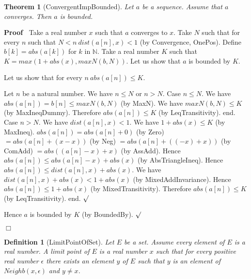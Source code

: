 \documentclass{article}
\newenvironment{forthel}{\begin{leftbar}}{\end{leftbar}}
\newenvironment{proof}{\noindent\textbf{Proof\ }}{\hspace*{\fill}$\Box$\medskip}
\newenvironment{subproof}{\begin{list}{}{}
		\item[\text{Proof}]}{\hfill $\surd$ \end{list}}
\newtheorem{theorem}{Theorem}
\newtheorem{definition}{Definition}
\newcommand{\NN}{\mathbb{N}}
\newcommand{\dotequal}{=}
\begin{document}
\begin{forthel}
	\begin{theorem}[ConvergentImpBounded]
	Let $a$ be a sequence. Assume that $a$ converges. Then $a$ is bounded.
	\end{theorem}
	\begin{proof}
	Take a real number $x$ such that $a$ converges to $x$.
	Take $N$ such that for every $n$ such that $N < n \ dist(a[n],x) < 1$ (by Convergence, OnePos).
	Define $b[k] = abs(a[k])$ for $k$ in $\NN$.
	Take a real number $K$ such that $K = max(1 + abs(x), maxN(b,N))$.
	Let us show that $a$ is bounded by $K$.
	\begin{subproof}
	Let us show that for every $n \ abs(a[n]) \leq K$.
	\begin{subproof} 
	Let $n$ be a natural number.
	We have $n \leq N$ or $n > N$.
	Case $n \leq N$.
	We have $abs(a[n]) = b[n] \leq maxN(b,N)$ (by MaxN).
	We have $maxN(b,N) \leq K$ (by MaxIneqDummy).
	Therefore $abs(a[n]) \leq K$ (by LeqTransitivity).
	end.
	Case $n > N$.
	We have $dist(a[n],x) < 1$.
	We have $1 + abs(x) \leq K$ (by MaxIneq).
	$abs(a[n]) \dotequal abs(a[n] + 0)$ (by Zero)
	$\dotequal abs(a[n] + (x - x))$ (by Neg)
	$\dotequal abs(a[n] + ((-x) + x))$ (by ComAdd)
	$\dotequal abs((a[n] - x) + x)$ (by AssAdd).
	Hence $abs(a[n]) \leq abs(a[n] - x) + abs(x)$ (by AbsTriangleIneq).
	Hence $abs(a[n]) \leq dist(a[n],x) + abs(x)$.
	We have $dist(a[n],x) + abs(x) < 1 + abs(x)$ (by MixedAddInvariance).
	Hence $abs(a[n]) \leq 1 + abs(x)$ (by MixedTransitivity).
	Therefore $abs(a[n]) \leq K$ (by LeqTransitivity).
	end.
	\end{subproof}
	Hence $a$ is bounded by $K$ (by BoundedBy).
	\end{subproof}
	\end{proof}
	
	\begin{definition}[LimitPointOfSet]
	Let $E$ be a set. Assume every element of $E$ is a real number. A limit point of $E$
	is a real number $x$ such that for every positive real number $\epsilon$ there exists an element
	$y$ of $E$ such that $y$ is an element of $Neighb(x,\epsilon)$ and $y \neq x$.
	\end{definition}
	

\end{forthel}
\end{document}
